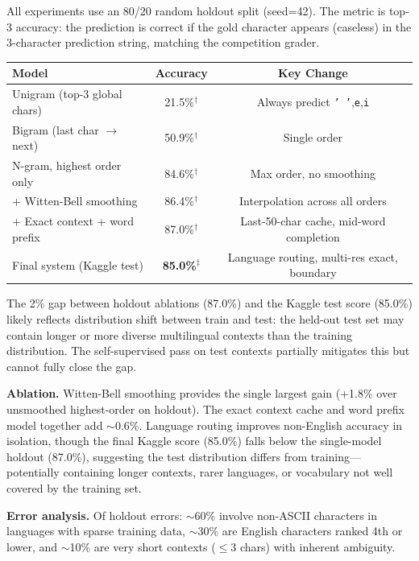 \documentclass[11pt]{article}
\begin{document}
All experiments use an 80/20 random holdout split (seed=42). The metric is top-3 accuracy: the prediction is correct if the gold character appears (caseless) in the 3-character prediction string, matching the competition grader.

\begin{table}[h]
\centering
\small
\begin{tabular}{lcc}
\toprule
\textbf{Model} & \textbf{Accuracy} & \textbf{Key Change} \\
\midrule
Unigram (top-3 global chars) & 21.5\%$^\dagger$ & Always predict \texttt{' '},\texttt{e},\texttt{i} \\
Bigram (last char $\to$ next) & 50.9\%$^\dagger$ & Single order \\
N-gram, highest order only & 84.6\%$^\dagger$ & Max order, no smoothing \\
+ Witten-Bell smoothing & 86.4\%$^\dagger$ & Interpolation across all orders \\
+ Exact context + word prefix & 87.0\%$^\dagger$ & Last-50-char cache, mid-word completion \\
Final system (Kaggle test) & \textbf{85.0\%}$^\ddagger$ & Language routing, multi-res exact, boundary \\
\bottomrule
\end{tabular}
\end{table}


\vspace{2pt}
\noindent The 2\% gap between holdout ablations (87.0\%) and the Kaggle test score (85.0\%) likely reflects distribution shift between train and test: the held-out test set may contain longer or more diverse multilingual contexts than the training distribution. The self-supervised pass on test contexts partially mitigates this but cannot fully close the gap.

\textbf{Ablation.}
Witten-Bell smoothing provides the single largest gain (+1.8\% over unsmoothed highest-order on holdout). The exact context cache and word prefix model together add ${\sim}$0.6\%. Language routing improves non-English accuracy in isolation, though the final Kaggle score (85.0\%) falls below the single-model holdout (87.0\%), suggesting the test distribution differs from training---potentially containing longer contexts, rarer languages, or vocabulary not well covered by the training set.

\textbf{Error analysis.}
Of holdout errors: ${\sim}$60\% involve non-ASCII characters in languages with sparse training data, ${\sim}$30\% are English characters ranked 4th or lower, and ${\sim}$10\% are very short contexts ($\leq$3 chars) with inherent ambiguity.
\end{document}
